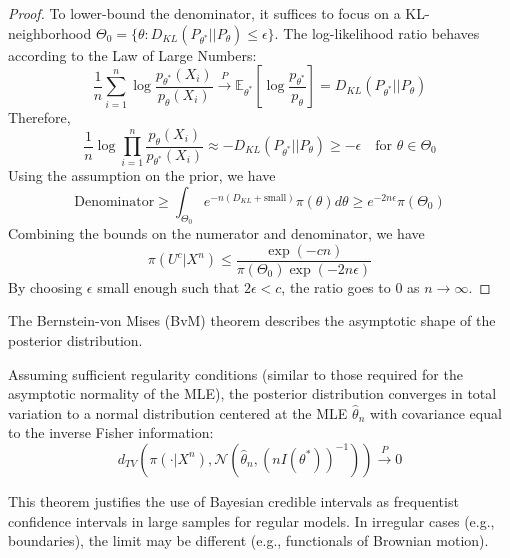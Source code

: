 \begin{proof}
To lower-bound the denominator, it suffices to focus on a KL-neighborhood $\Theta_0 = \{\theta : D_{KL}(P_{\theta^*} || P_\theta) \le \epsilon\}$. The log-likelihood ratio behaves according to the Law of Large Numbers:
$$
\frac{1}{n} \sum_{i=1}^n \log \frac{p_{\theta^*}(X_i)}{p_\theta(X_i)} \xrightarrow{P} \mathbb{E}_{\theta^*} \left[ \log \frac{p_{\theta^*}}{p_\theta} \right] = D_{KL}(P_{\theta^*} || P_\theta)
$$
Therefore,
$$
\frac{1}{n} \log \prod_{i=1}^n \frac{p_\theta(X_i)}{p_{\theta^*}(X_i)} \approx - D_{KL}(P_{\theta^*} || P_\theta) \ge -\epsilon \quad \text{for } \theta \in \Theta_0
$$
Using the assumption on the prior, we have
$$
\text{Denominator} \ge \int_{\Theta_0} e^{-n(D_{KL} + \text{small})} \pi(\theta) d\theta \ge e^{-2n\epsilon} \pi(\Theta_0)
$$
Combining the bounds on the numerator and denominator, we have
$$
\pi(U^c | X^n) \le \frac{\exp(-cn)}{\pi(\Theta_0) \exp(-2n\epsilon)}
$$
By choosing $\epsilon$ small enough such that $2\epsilon < c$, the ratio goes to 0 as $n \to \infty$.
\end{proof}



The Bernstein-von Mises (BvM) theorem describes the asymptotic shape of the posterior distribution.

\begin{thm}
Assuming sufficient regularity conditions (similar to those required for the asymptotic normality of the MLE), the posterior distribution converges in total variation to a normal distribution centered at the MLE $\hat{\theta}_n$ with covariance equal to the inverse Fisher information:
$$
d_{TV} \left( \pi(\cdot | X^n), \mathcal{N}(\hat{\theta}_n, (n I(\theta^*))^{-1}) \right) \xrightarrow{P} 0
$$
\end{thm}

\begin{remark}
This theorem justifies the use of Bayesian credible intervals as frequentist confidence intervals in large samples for regular models. In irregular cases (e.g., boundaries), the limit may be different (e.g., functionals of Brownian motion).
\end{remark}
